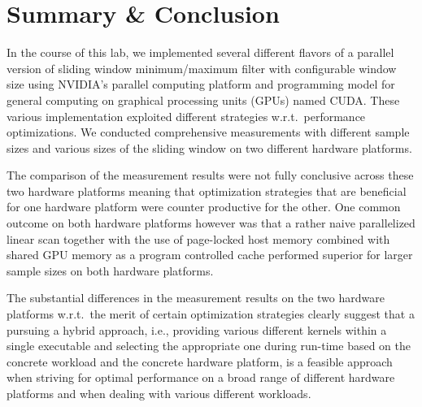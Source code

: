 \section{Summary \& Conclusion}

In the course of this lab, we implemented several different flavors of a parallel version of sliding window minimum/maximum filter with configurable window size using NVIDIA’s parallel computing platform and programming  model  for general computing on graphical processing units (GPUs) named  CUDA. These various implementation exploited different strategies w.r.t.\ performance optimizations. We conducted comprehensive measurements with different sample sizes and various sizes of the sliding window on two different hardware platforms.

The comparison of the measurement results were not fully conclusive across these two hardware platforms meaning that optimization strategies that are beneficial for one hardware platform were counter productive for the other. One common outcome on both hardware platforms however was that a rather naive parallelized linear scan together with the use of page-locked host memory combined with shared GPU memory as a program controlled cache performed superior for larger sample sizes on both hardware platforms.

The substantial differences in the measurement results on the two hardware platforms w.r.t.\ the merit of certain optimization strategies clearly suggest that a pursuing a hybrid approach, i.e., providing various different kernels within a single executable and selecting the appropriate one during run-time based on the concrete workload and the concrete hardware platform, is a feasible approach when striving for optimal performance on a broad range of different hardware platforms and when dealing with various different workloads.